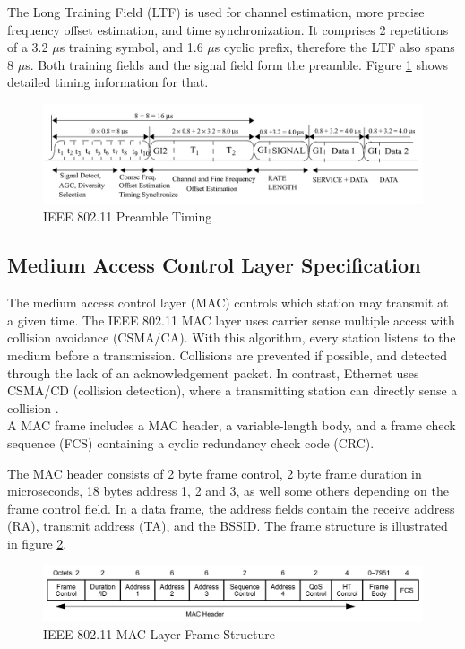 The Long Training Field (LTF) is used for channel estimation, more precise frequency offset estimation, and time synchronization. It comprises 2 repetitions of a 3.2 $\mu$s training symbol, and 1.6 $\mu$s cyclic prefix, therefore the LTF also spans 8 $\mu$s. Both training fields and the signal field form the preamble. Figure \ref{fig:preamble} shows detailed timing information for that.

\begin{figure}[H]
	\centering
	\includegraphics[width=\textwidth]{gfx/images/preamble-format}
	\caption[IEEE 802.11 Preamble Timing]{IEEE 802.11 Preamble Timing \cite{ieee2012}}
	\label{fig:preamble}
\end{figure}


\subsection{Medium Access Control Layer Specification} \label{sec:mac-format}

The medium access control layer (MAC) controls which station may transmit at a given time. The IEEE 802.11 MAC layer uses carrier sense multiple access with collision avoidance (CSMA/CA). With this algorithm, every station listens to the medium before a transmission. Collisions are prevented if possible, and detected through the lack of an acknowledgement packet. In contrast, Ethernet uses CSMA/CD (collision detection), where a transmitting station can directly sense a collision \cite{ieee802-3}.\\

A MAC frame includes a MAC header, a variable-length body, and a frame check sequence (FCS) containing a cyclic redundancy check code (CRC).

The MAC header consists of 2 byte frame control, 2 byte frame duration in microseconds, 18 bytes address 1, 2 and 3, as well some others depending on the frame control field. In a data frame, the address fields contain the receive address (RA), transmit address (TA), and the BSSID. The frame structure is illustrated in figure \ref{fig:mac-format}.

\begin{figure}[H]
	\centering
	\includegraphics[width=\textwidth]{gfx/images/mac-format}
	\caption[IEEE 802.11 MAC Layer Frame Structure]{IEEE 802.11 MAC Layer Frame Structure \cite{ieee2012}}
	\label{fig:mac-format}
\end{figure}


